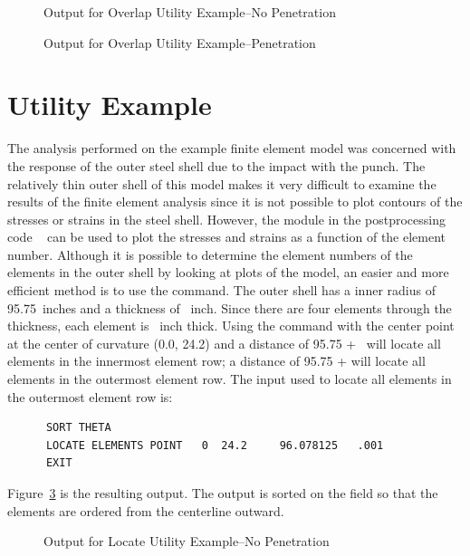 \begin{figure}

\caption{Output for Overlap Utility Example--No
Penetration}\label{exoverlapout}
\end{figure}

\begin{figure}

\caption{Output for Overlap Utility
Example--Penetration}\label{exoverlap2}
\end{figure}

\section{ Utility Example}

The analysis performed on the example finite element model was concerned
with the response of the outer steel shell due to the impact with the
punch.  The relatively thin outer shell of this model makes it very
difficult to examine the results of the finite element analysis since it
is not possible to plot contours of the stresses or strains in the steel
shell.  However, the  module in the postprocessing code
~\cite{BLOT} can be used to plot the stresses and strains as
a function of the element number.  Although it is possible to determine
the element numbers of the elements in the outer shell by looking at
plots of the model, an easier and more efficient method is to use the
 command.  The outer shell has a inner radius of
95.75~inches and a thickness of ~inch.  Since there are four
elements through the thickness, each element is ~inch thick.
Using the  command with the center point at the center
of curvature (0.0, 24.2) and a distance of 95.75 + \ will
locate all elements in the innermost element row; a distance of 95.75 +
 will locate all elements in the outermost element row.
The input used to locate all elements in the outermost element row is:

\begin{verbatim}
      SORT THETA
      LOCATE ELEMENTS POINT   0  24.2     96.078125   .001
      EXIT
\end{verbatim}

Figure~\ref{exlocateout} is the resulting output.  The output is sorted
on the  field so that the elements are ordered from the
centerline outward.

\begin{figure}

\caption{Output for Locate Utility Example--No Penetration}\label{exlocateout}
\end{figure}

